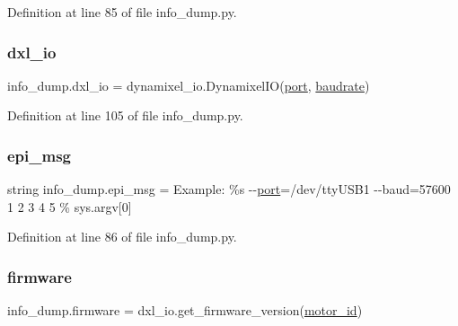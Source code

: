 Definition at line 85 of file info\+\_\+dump.\+py.

\mbox{\label{namespaceinfo__dump_abfbf78081220a30aef2aa3d8a46d4d0c}} 
\subsubsection{\texorpdfstring{dxl\+\_\+io}{dxl\_io}}
{\footnotesize\ttfamily info\+\_\+dump.\+dxl\+\_\+io = dynamixel\+\_\+io.\+Dynamixel\+IO(\hyperlink{namespaceinfo__dump_a6a0b57c32b7abb158439bb4e8b370c45}{port}, \hyperlink{namespaceinfo__dump_aa7d6b35ec273c6b59d04e755217a0134}{baudrate})}



Definition at line 105 of file info\+\_\+dump.\+py.

\mbox{\label{namespaceinfo__dump_a20ba822326945097385577b53888d244}} 
\subsubsection{\texorpdfstring{epi\+\_\+msg}{epi\_msg}}
{\footnotesize\ttfamily string info\+\_\+dump.\+epi\+\_\+msg = \textquotesingle{}Example\+: \%s -\/-\/\hyperlink{namespaceinfo__dump_a6a0b57c32b7abb158439bb4e8b370c45}{port}=/dev/tty\+U\+S\+B1 -\/-\/baud=57600 1 2 3 4 5\textquotesingle{} \% sys.\+argv\mbox{[}0\mbox{]}}



Definition at line 86 of file info\+\_\+dump.\+py.

\mbox{\label{namespaceinfo__dump_a24cc6416ad6ea3ee4cf38bf57e886c70}} 
\subsubsection{\texorpdfstring{firmware}{firmware}}
{\footnotesize\ttfamily info\+\_\+dump.\+firmware = dxl\+\_\+io.\+get\+\_\+firmware\+\_\+version(\hyperlink{namespaceinfo__dump_ab8304b7617ad78e51a49ee40b5f2f3fc}{motor\+\_\+id})}



